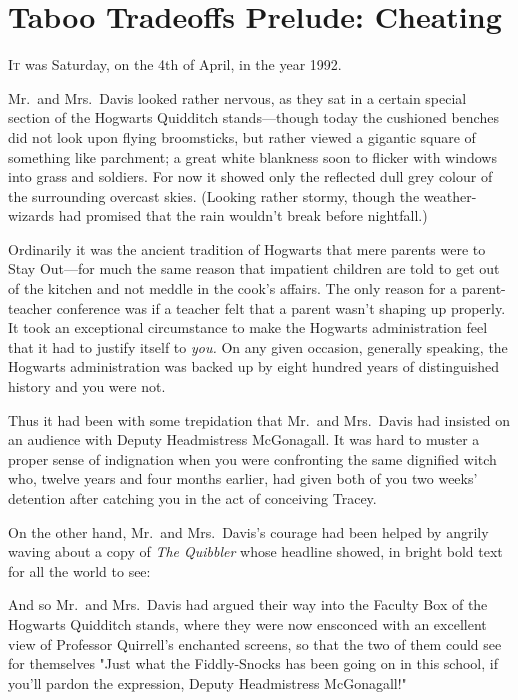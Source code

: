 \chapter{Taboo Tradeoffs Prelude: Cheating}

\lettrine{I}{t} was Saturday,
on the 4th of April, in the year 1992.

\quad\quad
Mr.~and Mrs.~Davis looked rather nervous, as they sat in a certain special
section of the Hogwarts Quidditch stands---though today the cushioned benches
did not look upon flying broomsticks, but rather viewed a gigantic square of
something like parchment; a great white blankness soon to flicker with windows
into grass and soldiers. For now it showed only the reflected dull grey colour
of the surrounding overcast skies. (Looking rather stormy, though the
weather-wizards had promised that the rain wouldn't break before nightfall.)

Ordinarily it was the ancient tradition of Hogwarts that mere parents were to
Stay Out---for much the same reason that impatient children are told to get out
of the kitchen and not meddle in the cook's affairs. The only reason for a
parent-teacher conference was if a teacher felt that a parent wasn't shaping up
properly. It took an exceptional circumstance to make the Hogwarts
administration feel that it had to justify itself to \emph{you.} On any given
occasion, generally speaking, the Hogwarts administration was backed up by
eight hundred years of distinguished history and you were not.

Thus it had been with some trepidation that Mr.~and Mrs.~Davis had insisted on
an audience with Deputy Headmistress McGonagall. It was hard to muster a proper
sense of indignation when you were confronting the same dignified witch who,
twelve years and four months earlier, had given both of you two weeks'
detention after catching you in the act of conceiving Tracey.

On the other hand, Mr.~and Mrs.~Davis's courage had been helped by angrily
waving about a copy of \emph{The Quibbler} whose headline showed, in bright
bold text for all the world to see:


And so Mr.~and Mrs.~Davis had argued their way into the Faculty Box of the
Hogwarts Quidditch stands, where they were now ensconced with an excellent view
of Professor Quirrell's enchanted screens, so that the two of them could see
for themselves "Just what the Fiddly-Snocks has been going on in this school,
if you'll pardon the expression, Deputy Headmistress McGonagall!"

